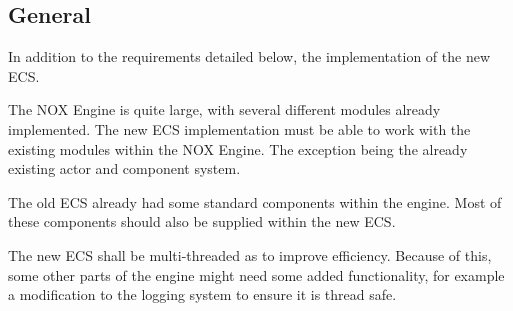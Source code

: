 \subsection{General}
In addition to the requirements detailed below, the implementation of the new ECS. 

The NOX Engine is quite large, with several different modules already implemented. 
The new ECS implementation must be able to work with the existing modules within the NOX Engine. 
The exception being the already existing actor and component system.

The old ECS already had some standard components within the engine. 
Most of these components should also be supplied within the new ECS.

The new ECS shall be multi-threaded as to improve efficiency.
Because of this, 
some other parts of the engine might need some added functionality, 
for example a modification to the logging system to ensure it is thread safe.